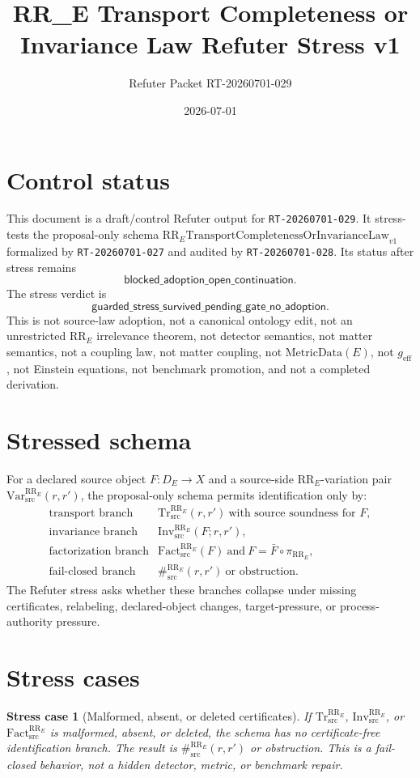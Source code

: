 \documentclass[11pt]{article}
\title{RR\_E Transport Completeness or Invariance Law Refuter Stress v1}
\author{Refuter Packet RT-20260701-029}
\date{2026-07-01}
\newcommand{\RRE}{\mathrm{RR}_{E}}
\newcommand{\VarRR}{\mathrm{Var}^{\RRE}_{\mathrm{src}}}
\newcommand{\TrRR}{\mathrm{Tr}^{\RRE}_{\mathrm{src}}}
\newcommand{\InvRR}{\mathrm{Inv}^{\RRE}_{\mathrm{src}}}
\newcommand{\FactRR}{\mathrm{Fact}^{\RRE}_{\mathrm{src}}}
\newcommand{\SepRR}{\#^{\RRE}_{\mathrm{src}}}
\newcommand{\LawRR}{\mathrm{RR}_{E}\mathrm{TransportCompletenessOrInvarianceLaw}_{v1}}
\newcommand{\MetricData}{\mathrm{MetricData}}
\newcommand{\geff}{g_{\mathrm{eff}}}
\newcommand{\BlockedOpen}{\mathsf{blocked\_adoption\_open\_continuation}}
\newcommand{\StressVerdict}{\mathsf{guarded\_stress\_survived\_pending\_gate\_no\_adoption}}
\newtheorem{stresscase}{Stress case}
\begin{document}
\maketitle

\section{Control status}

This document is a draft/control Refuter output for \texttt{RT-20260701-029}.
It stress-tests the proposal-only schema \(\LawRR\) formalized by
\texttt{RT-20260701-027} and audited by \texttt{RT-20260701-028}. Its status
after stress remains
\[
  \BlockedOpen .
\]
The stress verdict is
\[
  \StressVerdict .
\]
This is not source-law adoption, not a canonical ontology edit, not an
unrestricted \(\RRE\) irrelevance theorem, not detector semantics, not matter
semantics, not a coupling law, not matter coupling, not \(\MetricData(E)\),
not \(\geff\), not Einstein equations, not benchmark promotion, and not a
completed derivation.

\section{Stressed schema}

For a declared source object \(F:D_E\to X\) and a source-side
\(\RRE\)-variation pair \(\VarRR(r,r')\), the proposal-only schema permits
identification only by:
\[
\begin{array}{ll}
\text{transport branch} & \TrRR(r,r')\ \text{with source soundness for }F,\\
\text{invariance branch} & \InvRR(F;r,r'),\\
\text{factorization branch} & \FactRR(F)\ \text{and}\ F=\bar F\circ\pi_{\RRE},\\
\text{fail-closed branch} & \SepRR(r,r')\ \text{or obstruction}.
\end{array}
\]
The Refuter stress asks whether these branches collapse under missing
certificates, relabeling, declared-object changes, target-pressure, or
process-authority pressure.

\section{Stress cases}

\begin{stresscase}[Malformed, absent, or deleted certificates]
If \(\TrRR\), \(\InvRR\), or \(\FactRR\) is malformed, absent, or deleted,
the schema has no certificate-free identification branch. The result is
\(\SepRR(r,r')\) or obstruction. This is a fail-closed behavior, not a hidden
detector, metric, or benchmark repair.
\end{stresscase}
\end{document}
